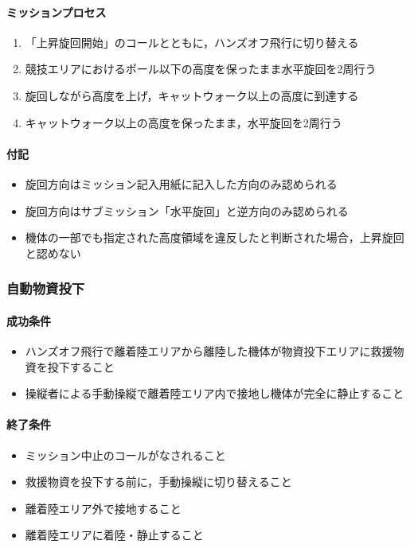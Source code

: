 \paragraph{ミッションプロセス}
\begin{enumerate}
  \item 「上昇旋回開始」のコールとともに，ハンズオフ飛行に切り替える
  \item 競技エリアにおけるポール以下の高度を保ったまま水平旋回を2周行う
  \item 旋回しながら高度を上げ，キャットウォーク以上の高度に到達する
  \item キャットウォーク以上の高度を保ったまま，水平旋回を2周行う
\end{enumerate}
\paragraph{付記}
\begin{itemize}
  \item 旋回方向はミッション記入用紙に記入した方向のみ認められる
  \item 旋回方向はサブミッション「水平旋回」と逆方向のみ認められる
  \item 機体の一部でも指定された高度領域を違反したと判断された場合，上昇旋回と認めない
\end{itemize}

\subsubsection{自動物資投下}
\paragraph{成功条件}
\begin{itemize}
  \item ハンズオフ飛行で離着陸エリアから離陸した機体が物資投下エリアに救援物資を投下すること
  \item 操縦者による手動操縦で離着陸エリア内で接地し機体が完全に静止すること
\end{itemize}
\paragraph{終了条件}
\begin{itemize}
  \item ミッション中止のコールがなされること
  \item 救援物資を投下する前に，手動操縦に切り替えること
  \item 離着陸エリア外で接地すること
  \item 離着陸エリアに着陸・静止すること
\end{itemize}
